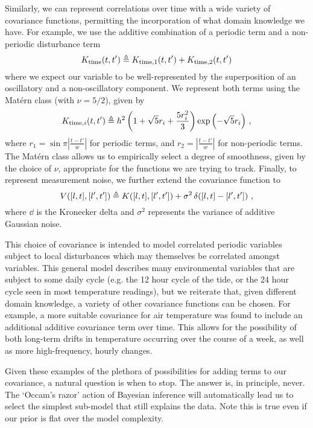 \documentclass{acmtrans2m}
\begin{document}
Similarly, we can represent correlations over time with a wide variety of covariance functions, permitting the incorporation of what domain knowledge we have. For example, we use the additive combination of a periodic term and a non-periodic disturbance term 
\begin{equation}
 K_\text{time}(t,t')\triangleq K_{\text{time},1}(t,t')+K_{\text{time},2}(t,t')
\end{equation}
where we expect our variable to be well-represented by the superposition of an oscillatory and a non-oscillatory component. We represent both terms using the Mat\'{e}rn class \cite{GPsBook} (with $\nu=5/2$), given by
\begin{equation} \label{eq:matern}
K_{\text{time},i}(t,t') \triangleq h^2 \left(1+\sqrt{5}r_i+\frac{5r_i^2}{3}\right)\exp\left(-\sqrt{5}r_i\right)\,,
\end{equation}
where $r_1 = \sin \pi \left|\frac{t-t'}{w}\right|$ for periodic terms, and $r_2 = \left|\frac{t-t'}{w}\right|$ for non-periodic terms. The Mat\'{e}rn class allows us to empirically select a degree of smoothness, given by the choice of $\nu$, appropriate for the functions we are trying to track. Finally, to represent measurement noise, we further extend the covariance function to
\small\begin{equation}
V([l,t],[l',t'])\triangleq K([l,t],[l',t'])+ \sigma^2\,\delta\!\left([l,t]-[l',t']\right)\,,
\end{equation}\normalsize
where $\dd{}{}$ is the Kronecker delta and $\sigma^2$ represents the variance of additive Gaussian noise.

This choice of covariance is intended to model correlated periodic variables subject to local disturbances which may themselves be correlated amongst variables. This general model describes many environmental variables that are subject to some daily cycle (e.g. the 12 hour cycle of the tide, or the 24 hour cycle seen in most temperature readings), but we reiterate that, given different domain knowledge, a variety of other covariance functions can be chosen. For example, a more suitable covariance for air temperature was found to include an additional additive covariance term over time. This allows for the possibility of both long-term drifts in temperature occurring over the course of a week, as well as more high-frequency, hourly changes.

Given these examples of the plethora of possibilities for adding terms to our covariance, a natural question is when to stop. The answer is, in principle, never. The `Occam's razor' action of Bayesian inference \cite{MKBook} will automatically lead us to select the simplest sub-model that still explains the data. Note this is true even if our prior is flat over the model complexity. 
\end{document}
